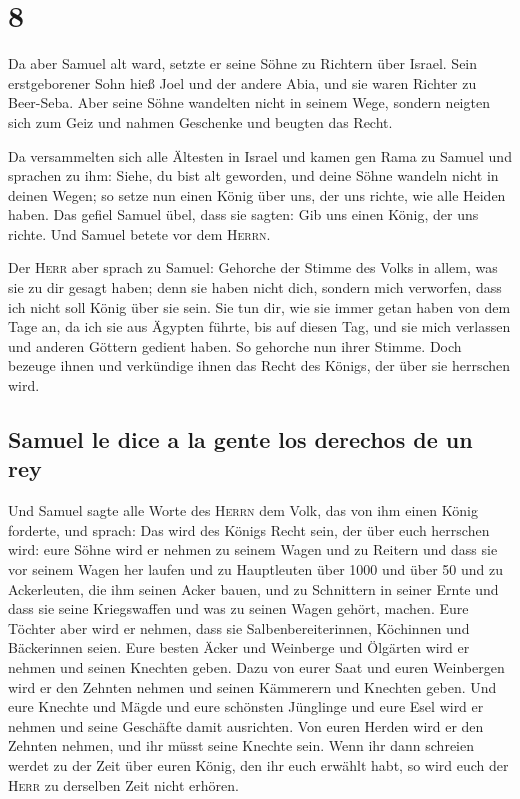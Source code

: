 \hypertarget{section-7}{%
\section{8}\label{section-7}}

 Da aber Samuel alt ward, setzte er seine Söhne zu
Richtern über Israel.  Sein erstgeborener Sohn hieß Joel
und der andere Abia, und sie waren Richter zu Beer-Seba. 
Aber seine Söhne wandelten nicht in seinem Wege, sondern neigten sich
zum Geiz und nahmen Geschenke und beugten das Recht.

 Da versammelten sich alle Ältesten in Israel und kamen
gen Rama zu Samuel  und sprachen zu ihm: Siehe, du bist
alt geworden, und deine Söhne wandeln nicht in deinen Wegen; so setze
nun einen König über uns, der uns richte, wie alle Heiden haben.
 Das gefiel Samuel übel, dass sie sagten: Gib uns einen
König, der uns richte. Und Samuel betete vor dem \textsc{Herrn}.

 Der \textsc{Herr} aber sprach zu Samuel: Gehorche der
Stimme des Volks in allem, was sie zu dir gesagt haben; denn sie haben
nicht dich, sondern mich verworfen, dass ich nicht soll König über sie
sein.  Sie tun dir, wie sie immer getan haben von dem Tage
an, da ich sie aus Ägypten führte, bis auf diesen Tag, und sie mich
verlassen und anderen Göttern gedient haben.  So gehorche
nun ihrer Stimme. Doch bezeuge ihnen und verkündige ihnen das Recht des
Königs, der über sie herrschen wird.

\hypertarget{samuel-le-dice-a-la-gente-los-derechos-de-un-rey}{%
\subsection{Samuel le dice a la gente los derechos de un
rey}\label{samuel-le-dice-a-la-gente-los-derechos-de-un-rey}}

 Und Samuel sagte alle Worte des \textsc{Herrn} dem Volk,
das von ihm einen König forderte,  und sprach: Das wird
des Königs Recht sein, der über euch herrschen wird: eure Söhne wird er
nehmen zu seinem Wagen und zu Reitern und dass sie vor seinem Wagen her
laufen  und zu Hauptleuten über 1000 und über 50 und zu
Ackerleuten, die ihm seinen Acker bauen, und zu Schnittern in seiner
Ernte und dass sie seine Kriegswaffen und was zu seinen Wagen gehört,
machen.  Eure Töchter aber wird er nehmen, dass sie
Salbenbereiterinnen, Köchinnen und Bäckerinnen seien. 
Eure besten Äcker und Weinberge und Ölgärten wird er nehmen und seinen
Knechten geben.  Dazu von eurer Saat und euren Weinbergen
wird er den Zehnten nehmen und seinen Kämmerern und Knechten geben.
 Und eure Knechte und Mägde und eure schönsten Jünglinge
und eure Esel wird er nehmen und seine Geschäfte damit ausrichten.
 Von euren Herden wird er den Zehnten nehmen, und ihr
müsst seine Knechte sein.  Wenn ihr dann schreien werdet
zu der Zeit über euren König, den ihr euch erwählt habt, so wird euch
der \textsc{Herr} zu derselben Zeit nicht erhören.

